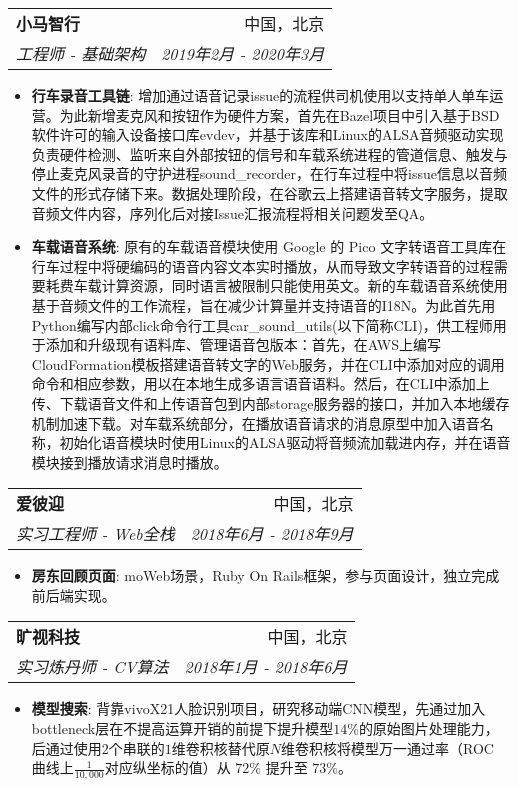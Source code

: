 \documentclass[letterpaper,11pt]{article}
\makeatletter
\newcommand{\resumeItem}[2]{
	\item\small{
		\textbf{#1}{: #2 \vspace{-2pt}}
	}
}
\newcommand{\resumeSubheading}[4]{
	\vspace{-1pt}\item
	\begin{tabular*}{0.97\textwidth}[t]{l@{\extracolsep{\fill}}r}
		\textbf{#1} & #2 \\
		\textit{\small#3} & \textit{\small #4} \\
	\end{tabular*}\vspace{-5pt}
}
\newcommand{\resumeSubSubheading}[2]{
	\begin{tabular*}{0.97\textwidth}{l@{\extracolsep{\fill}}r}
		\textit{\small#1} & \textit{\small #2} \\
	\end{tabular*}\vspace{-5pt}
}
\newcommand{\resumeSubHeadingListEnd}{\end{itemize}}
\newcommand{\resumeItemListStart}{\begin{itemize}}
\newcommand{\resumeItemListEnd}{\end{itemize}\vspace{-5pt}}
\makeatother
\begin{document}
\begin{spacing}{0.96}
		\resumeSubheading
		{小马智行}{中国，北京}
		{工程师 - 基础架构}{2019年2月 - 2020年3月}
		\resumeItemListStart
		\resumeItem{行车录音工具链}
		{增加通过语音记录issue的流程供司机使用以支持单人单车运营。为此新增麦克风和按钮作为硬件方案，首先在Bazel项目中引入基于BSD软件许可的输入设备接口库evdev，并基于该库和Linux的ALSA音频驱动实现负责硬件检测、监听来自外部按钮的信号和车载系统进程的管道信息、触发与停止麦克风录音的守护进程sound\_recorder，在行车过程中将issue信息以音频文件的形式存储下来。数据处理阶段，在谷歌云上搭建语音转文字服务，提取音频文件内容，序列化后对接Issue汇报流程将相关问题发至QA。}
		\resumeItem{车载语音系统}
		{原有的车载语音模块使用 Google 的 Pico 文字转语音工具库在行车过程中将硬编码的语音内容文本实时播放，从而导致文字转语音的过程需要耗费车载计算资源，同时语言被限制只能使用英文。新的车载语音系统使用基于音频文件的工作流程，旨在减少计算量并支持语音的I18N。为此首先用Python编写内部click命令行工具car\_sound\_utils(以下简称CLI)，供工程师用于添加和升级现有语料库、管理语音包版本：首先，在AWS上编写CloudFormation模板搭建语音转文字的Web服务，并在CLI中添加对应的调用命令和相应参数，用以在本地生成多语言语音语料。然后，在CLI中添加上传、下载语音文件和上传语音包到内部storage服务器的接口，并加入本地缓存机制加速下载。对车载系统部分，在播放语音请求的消息原型中加入语音名称，初始化语音模块时使用Linux的ALSA驱动将音频流加载进内存，并在语音模块接到播放请求消息时播放。}
		\resumeItemListEnd
		
		
		
		
		\resumeSubheading
		{爱彼迎}{中国，北京}
		{实习工程师 - Web全栈}{2018年6月 - 2018年9月}
		\resumeItemListStart
		\resumeItem{房东回顾页面}
		{moWeb场景，Ruby On Rails框架，参与页面设计，独立完成前后端实现。}
		\resumeItemListEnd
		
		\resumeSubheading
		{旷视科技}{中国，北京}
		{实习炼丹师 - CV算法}{2018年1月 - 2018年6月}
		\resumeItemListStart
		\resumeItem{模型搜索}
		{背靠vivoX21人脸识别项目，研究移动端CNN模型，先通过加入bottleneck层在不提高运算开销的前提下提升模型$14\%$的原始图片处理能力，后通过使用$2$个串联的$1$维卷积核替代原$N$维卷积核将模型万一通过率（ROC 曲线上$\frac{1}{10,000}$对应纵坐标的值）从 $72\%$ 提升至 $73\%$。}
		\resumeItemListEnd
		

\end{spacing}
\end{document}
